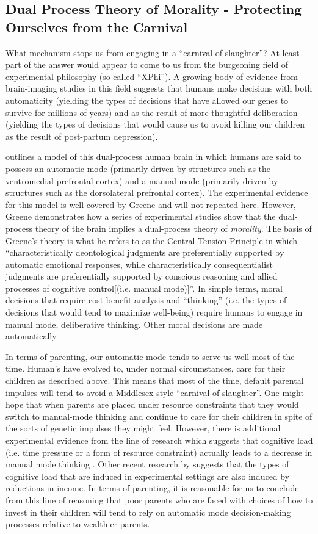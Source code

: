 \documentclass[1p, review]{elsarticle}\usepackage[]{graphicx}\usepackage[]{color}
\begin{document}
\subsection{Dual Process Theory of Morality - Protecting Ourselves from the Carnival}
What mechanism stops us from engaging in a ``carnival of slaughter''? At least part of the answer would appear to come to us from the burgeoning field of experimental philosophy (so-called ``XPhi''). A growing body of evidence from brain-imaging studies in this field suggests that humans make decisions with both automaticity (yielding the types of decisions that have allowed our genes to survive for millions of years) and as the result of more thoughtful deliberation (yielding the types of decisions that would cause us to avoid killing our children as the result of post-partum depression). 

\citet{Greene2014} outlines a model of this dual-process human brain in which humans are said to possess an automatic mode (primarily driven by structures such as the ventromedial prefrontal cortex) and a manual mode (primarily driven by structures such as the dorsolateral prefrontal cortex). The experimental evidence for this model is well-covered by Greene and will not repeated here. However, Greene demonstrates how a series of experimental studies show that the dual-process theory of the brain implies a dual-process theory of \emph{morality}. The basis of Greene's theory is what he refers to as the Central Tension Principle in which ``characteristically deontological judgments are preferentially supported by automatic emotional responses, while characteristically consequentialist judgments are preferentially supported by conscious reasoning and allied processes of cognitive control[(i.e. manual mode)]''. In simple terms, moral decisions that require cost-benefit analysis and ``thinking'' (i.e. the types of decisions that would tend to maximize well-being) require humans to engage in manual mode, deliberative thinking. Other moral decisions are made automatically.

In terms of parenting, our automatic mode tends to serve us well most of the time. Human's have evolved to, under normal circumstances, care for their children as described above. This means that most of the time, default parental impulses will tend to avoid a Middlesex-style ``carnival of slaughter''. One might hope that when parents are placed under resource constraints that they would switch to manual-mode thinking and continue to care for their children in spite of the sorts of genetic impulses they might feel. However, there is additional experimental evidence from the \citet{Greene2014} line of research which suggests that cognitive load (i.e. time pressure or a form of resource constraint) actually leads to a decrease in manual mode thinking \citep{Suter2011, Paxton2012}. Other recent research by \citet{Mani2013} suggests that the types of cognitive load that are induced in experimental settings are also induced by reductions in income. In terms of parenting, it is reasonable for us to conclude from this line of reasoning that poor parents who are faced with choices of how to invest in their children will tend to rely on automatic mode decision-making processes relative to wealthier parents. 
\end{document}
